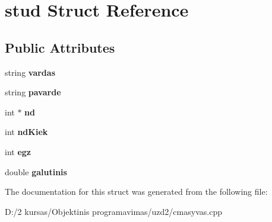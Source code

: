 \hypertarget{structstud}{}\section{stud Struct Reference}
\label{structstud}
\subsection*{Public Attributes}
\begin{DoxyCompactItemize}
\item 
\mbox{\label{structstud_a1a597f1d3c0eb928afdc0e4833e17af6}} 
string {\bfseries vardas}
\item 
\mbox{\label{structstud_a3390e6ce6d4a086574143b879a7da881}} 
string {\bfseries pavarde}
\item 
\mbox{\label{structstud_a336908522e5f9f021c089c59945f6b42}} 
int $\ast$ {\bfseries nd}
\item 
\mbox{\label{structstud_a4d0ebbabaab6efb92f2e2bc67428a5b7}} 
int {\bfseries nd\+Kiek}
\item 
\mbox{\label{structstud_a4f0cd476d21347c3ded4b71eb5e92090}} 
int {\bfseries egz}
\item 
\mbox{\label{structstud_a63a616f427540e9b4eb3ddf2c5f6c536}} 
double {\bfseries galutinis}
\end{DoxyCompactItemize}


The documentation for this struct was generated from the following file\+:\begin{DoxyCompactItemize}
\item 
D\+:/2 kursas/\+Objektinis programavimas/uzd2/cmasyvas.\+cpp\end{DoxyCompactItemize}
